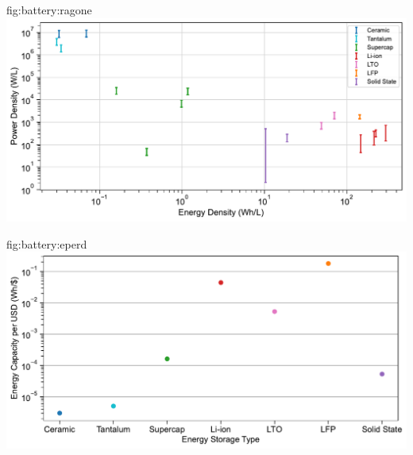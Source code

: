 \begin{definefigure}{fig:battery:ragone}
\centering
\includegraphics[width=\columnwidth]{figs/ragone}
\caption{Ragone plot for components listed in \cref{tab:battery:cost}, in log-log scale. 
The upper cap represents the maximum power that a storage element can provide while the lower cap represents the effective, continuous power it can provide.
A ragone plot directly compares power and energy density for different devices. Ceramic and tantalum capacitors are very power dense, but provide abysmal energy density. Batteries provide superior energy density, are less power dense. Supercapacitors exist between these two extremes. Even though batteries do not provide comparable power density to either capacitors or supercapacitors, they can still provide sufficient power for common wireless sensor workloads, like operating a short or long range radio.}
\end{definefigure}

\begin{definefigure}{fig:battery:eperd}
\centering
\includegraphics[width=\columnwidth]{figs/energy_per_cost.pdf}
\caption{
    Average energy capacity for various technologies selected in \cref{tab:battery:cost}, normalized by price in USD. Wherever possible, component costs were determined by their price in the United States. In regards to energy capacity, batteries offer 3-5 orders of magnitude more energy capacity per dollar than ceramic and tantalum capacitors. Batteries also offer 2-3 orders of magnitude more capacity than supercapacitors.
}
\end{definefigure}
